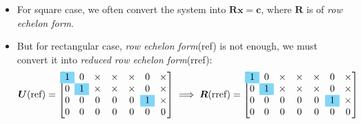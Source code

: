 \begin{itemize}
\item
For square case, we often convert the system into $\bm{Rx} = \bm c$, where $\bm R$ is of \textit{row echelon form}.
\item
But for rectangular case, \textit{row echelon form}(ref) is not enough, we must convert it into \emph{reduced row echelon form}(rref):
\[\bm U\text{(ref)} = \left[
\begin{array}{@{}ccccccc@{}}
\cellcolor{cyan!50}1&0&\x&\x&\x&0&\x\\
0&\cellcolor{cyan!50}1&\x&\x&\x&0&\x\\
0&0&0&0&0&\cellcolor{cyan!50}1&\x\\
0&0&0&0&0&0&0
\end{array}
\right]
\implies
\bm R\text{(rref)} = \left[
\begin{array}{@{}ccccccc@{}}
\cellcolor{cyan!50}1&0&\x&\x&\x&0&\x\\
0&\cellcolor{cyan!50}1&\x&\x&\x&0&\x\\
0&0&0&0&0&\cellcolor{cyan!50}1&\x\\
0&0&0&0&0&0&0
\end{array}
\right]\]
\end{itemize}
